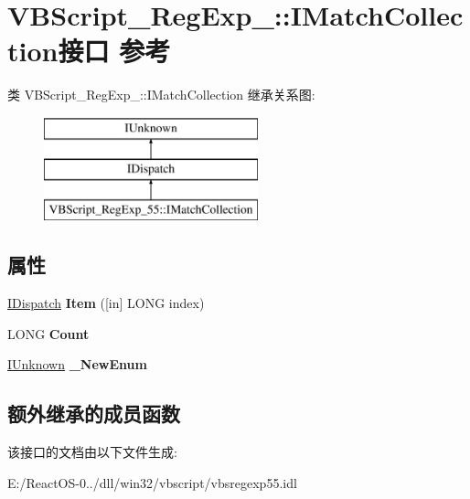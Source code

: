 \hypertarget{interface_v_b_script___reg_exp__55_1_1_i_match_collection}{}\section{V\+B\+Script\+\_\+\+Reg\+Exp\+\_\+:\+:I\+Match\+Collection接口 参考}
\label{interface_v_b_script___reg_exp__55_1_1_i_match_collection}
类 V\+B\+Script\+\_\+\+Reg\+Exp\+\_\+:\+:I\+Match\+Collection 继承关系图\+:\begin{figure}[H]
\begin{center}
\leavevmode
\includegraphics[height=3.000000cm]{interface_v_b_script___reg_exp__55_1_1_i_match_collection}
\end{center}
\end{figure}
\subsection*{属性}
\begin{DoxyCompactItemize}
\item 
\mbox{\label{interface_v_b_script___reg_exp__55_1_1_i_match_collection_a320066049988bece5006d57b3d1994b8}} 
\hyperlink{interface_i_dispatch}{I\+Dispatch} {\bfseries Item} (\mbox{[}in\mbox{]} L\+O\+NG index)
\item 
\mbox{\label{interface_v_b_script___reg_exp__55_1_1_i_match_collection_aad1521903898f5b6b5f027b12c168558}} 
L\+O\+NG {\bfseries Count}
\item 
\mbox{\label{interface_v_b_script___reg_exp__55_1_1_i_match_collection_a4ba29b8a2059d066ab91498b8196067a}} 
\hyperlink{interface_i_unknown}{I\+Unknown} {\bfseries \+\_\+\+New\+Enum}
\end{DoxyCompactItemize}
\subsection*{额外继承的成员函数}


该接口的文档由以下文件生成\+:\begin{DoxyCompactItemize}
\item 
E\+:/\+React\+O\+S-\/0../dll/win32/vbscript/vbsregexp55.\+idl\end{DoxyCompactItemize}
